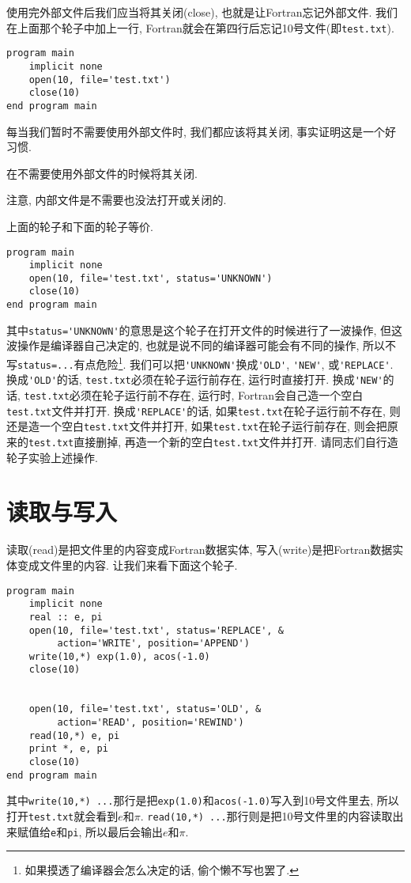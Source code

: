 使用完外部文件后我们应当将其关闭(close), 也就是让Fortran忘记外部文件. 我们在上面那个轮子中加上一行, Fortran就会在第四行后忘记10号文件(即\verb|test.txt|).
\begin{verbatim}
program main
    implicit none
    open(10, file='test.txt')
    close(10)
end program main
\end{verbatim}

每当我们暂时不需要使用外部文件时, 我们都应该将其关闭, 事实证明这是一个好习惯.

\begin{convention}
    在不需要使用外部文件的时候将其关闭.
\end{convention}

注意, 内部文件是不需要也没法打开或关闭的.

上面的轮子和下面的轮子等价.
\begin{verbatim}
program main
    implicit none
    open(10, file='test.txt', status='UNKNOWN')
    close(10)
end program main
\end{verbatim}
其中\verb|status='UNKNOWN'|的意思是这个轮子在打开文件的时候进行了一波操作, 但这波操作是编译器自己决定的, 也就是说不同的编译器可能会有不同的操作, 所以不写\verb|status=...|有点危险\footnote{如果摸透了编译器会怎么决定的话, 偷个懒不写也罢了.\label{no_add}}. 我们可以把\verb|'UNKNOWN'|换成\verb|'OLD'|, \verb|'NEW'|, 或\verb|'REPLACE'|. 换成\verb|'OLD'|的话, \verb|test.txt|必须在轮子运行前存在, 运行时直接打开. 换成\verb|'NEW'|的话, \verb|test.txt|必须在轮子运行前不存在, 运行时, Fortran会自己造一个空白\verb|test.txt|文件并打开. 换成\verb|'REPLACE'|的话, 如果\verb|test.txt|在轮子运行前不存在, 则还是造一个空白\verb|test.txt|文件并打开, 如果\verb|test.txt|在轮子运行前存在, 则会把原来的\verb|test.txt|直接删掉, 再造一个新的空白\verb|test.txt|文件并打开. 请同志们自行造轮子实验上述操作.

\section{读取与写入}

读取(read)是把文件里的内容变成Fortran数据实体, 写入(write)是把Fortran数据实体变成文件里的内容. 让我们来看下面这个轮子.
\begin{verbatim}
program main
    implicit none
    real :: e, pi
    open(10, file='test.txt', status='REPLACE', &
         action='WRITE', position='APPEND')
    write(10,*) exp(1.0), acos(-1.0)
    close(10)


    open(10, file='test.txt', status='OLD', &
         action='READ', position='REWIND')
    read(10,*) e, pi
    print *, e, pi
    close(10)
end program main
\end{verbatim}
其中\verb|write(10,*) ...|那行是把\verb|exp(1.0)|和\verb|acos(-1.0)|写入到10号文件里去, 所以打开\verb|test.txt|就会看到$e$和$\pi$. \verb|read(10,*) ...|那行则是把10号文件里的内容读取出来赋值给\verb|e|和\verb|pi|, 所以最后会输出$e$和$\pi$.

